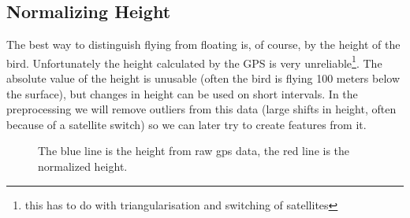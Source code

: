  \subsection{Normalizing Height}
 The best way to distinguish flying from floating is, of course, by the height of the bird. Unfortunately the height calculated by the GPS is very unreliable\footnote{this has to do with triangularisation and switching of satellites}. The absolute value of the height is unusable (often the bird is flying 100 meters below the surface), but changes in height can be used on short intervals. In the preprocessing we will remove outliers from this data (large shifts in height, often because of a satellite switch) so we can later try to create features from it.

\begin{figure}[htb!]
 \begin{center}
 \end{center}
 \caption{The blue line is the height from raw gps data, the red line is the normalized height.}
 \label{fig:heightnorm}
\end{figure}

